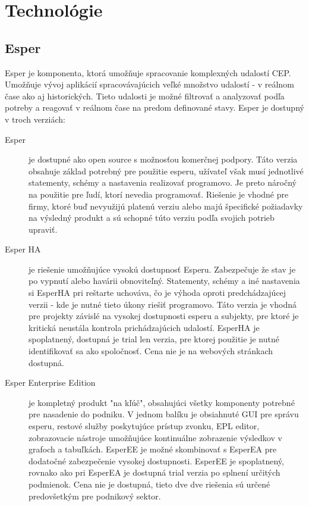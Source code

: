 \chapter{Technológie}
\section{Esper}
	Esper je komponenta, ktorá umožňuje spracovanie komplexných udalostí \ac{CEP}. Umožňuje vývoj aplikácií spracovávajúcich veľké množstvo udalostí - v reálnom čase ako aj historických. Tieto udalosti je možné filtrovať a analyzovať podľa potreby a reagovať v reálnom čase na predom definované stavy.  Esper je dostupný v troch verziách:
	\begin{description}
		\item[Esper] je dostupné ako open source s možnosťou komerčnej podpory. Táto verzia obsahuje základ potrebný pre použitie esperu, užívateľ však musí jednotlivé statementy, schémy a nastavenia realizovať programovo. Je preto náročný na použitie pre ľudí, ktorí nevedia programovať. Riešenie je vhodné pre firmy, ktoré buď nevyužijú platenú verziu alebo majú špecifické požiadavky na výsledný produkt a sú schopné túto verziu podľa svojich potrieb upraviť.
		
		\item[Esper HA] je riešenie umožňujúce vysokú dostupnosť Esperu. Zabezpečuje že stav je po vypnutí alebo havárii obnoviteľný. Statementy, schémy a iné nastavenia si EsperHA pri reštarte uchováva, čo je výhoda oproti predchádzajúcej verzii - kde je nutné tieto úkony riešiť programovo. Táto verzia je vhodná pre projekty závislé na vysokej dostupnosti esperu a subjekty, pre ktoré je kritická neustála kontrola prichádzajúcich udalostí.
		EsperHA je spoplatnený, dostupná je trial len verzia, pre ktorej použitie je nutné identifikovať sa ako spoločnosť. Cena nie je na webových stránkach dostupná.
		
		\item[Esper Enterprise Edition] je kompletný produkt "na kľúč", obsahujúci všetky komponenty potrebné pre nasadenie do podniku. V jednom balíku je obsiahnuté GUI pre správu esperu, restové služby poskytujúce prístup zvonku, \ac{EPL} editor, zobrazovacie nástroje umožňujúce kontinuálne zobrazenie výsledkov v grafoch a tabuľkách. EsperEE je možné skombinovať s EsperEA pre dodatočné zabezpečenie vysokej dostupnosti. EsperEE je spoplatnený, rovnako ako pri EsperEA je dostupná trial verzia po splnení určitých podmienok. Cena nie je dostupná, tieto dve dve riešenia sú určené predovšetkým pre podnikový sektor.
	\end{description}
	
